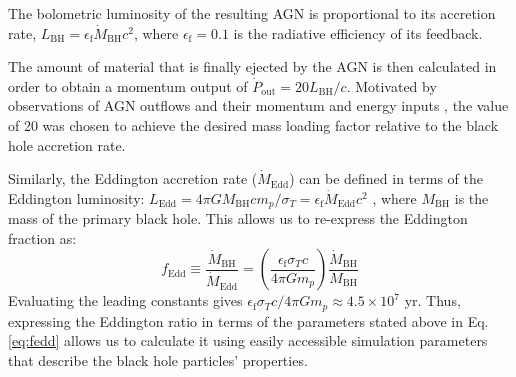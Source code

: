 \documentclass[twocolumn, linenumbers]{aastex631}
\newcommand{\eq}{Eq.\hspace{.2em}}
\newcommand{\mbh}{M_{\text{BH}}}
\newcommand{\mbhd}{\dot{M}_{\text{BH}}}
\newcommand{\fedd}{f_{\text{Edd}}}
\begin{document}
The bolometric luminosity of the resulting AGN is proportional to its accretion rate, $L_{\text{BH}}=\epsilon_{\text{f}}\mbhd c^2$, where $\epsilon_\text{f}=0.1$ is the radiative efficiency of its feedback.



The amount of material that is finally ejected by the AGN is then calculated in order to obtain a momentum output of $\dot{P}_{\text{out}}=20L_{\text{BH}}/c$.  Motivated by observations of AGN outflows and their momentum and energy inputs \citep{Fiore2017}, the value of 20 was chosen to achieve the desired mass loading factor relative to the black hole accretion rate.




Similarly, the Eddington accretion rate ($\dot{M}_{\text{Edd}}$) can be defined in terms of the Eddington luminosity: $L_{\text{Edd}}=4\pi G\mbh cm_p/\sigma_T=\epsilon_{\text{f}} \dot{M}_{\text{Edd}}c^2$ \citep{Thomas_2019}, where $\mbh$ is the mass of the primary black hole.  This allows us to re-express the Eddington fraction as: 
\begin{equation}
    \fedd\equiv \frac{\mbhd}{\dot{M}_{\text{Edd}}}=\left(\frac{\epsilon_\text{f} \sigma_T c}{4\pi Gm_p}\right)\frac{\mbhd}{\mbh}\label{eq:fedd}
\end{equation}
Evaluating the leading constants gives $\epsilon_\text{f} \sigma_T c/4\pi Gm_p\approx 4.5\times 10^7$ yr.  Thus, expressing the Eddington ratio in terms of the parameters stated above in \eq \ref{eq:fedd} allows us to calculate it using easily accessible simulation parameters that describe the black hole particles' properties. 
\end{document}
